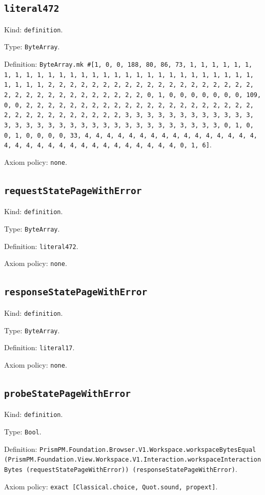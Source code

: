 \documentclass[11pt]{article}
\begin{document}
\subsection*{\texttt{literal472}}
\noindent Kind: \texttt{definition}.\par
\noindent Type: \texttt{ByteArray}.\par
\noindent Definition: \texttt{ByteArray.mk \#[1, 0, 0, 188, 80, 86, 73, 1, 1, 1, 1, 1, 1, 1, 1, 1, 1, 1, 1, 1, 1, 1, 1, 1, 1, 1, 1, 1, 1, 1, 1, 1, 1, 1, 1, 1, 1, 1, 1, 1, 2, 2, 2, 2, 2, 2, 2, 2, 2, 2, 2, 2, 2, 2, 2, 2, 2, 2, 2, 2, 2, 2, 2, 2, 2, 2, 2, 2, 2, 2, 2, 2, 0, 1, 0, 0, 0, 0, 0, 0, 0, 109, 0, 0, 2, 2, 2, 2, 2, 2, 2, 2, 2, 2, 2, 2, 2, 2, 2, 2, 2, 2, 2, 2, 2, 2, 2, 2, 2, 2, 2, 2, 2, 2, 2, 2, 3, 3, 3, 3, 3, 3, 3, 3, 3, 3, 3, 3, 3, 3, 3, 3, 3, 3, 3, 3, 3, 3, 3, 3, 3, 3, 3, 3, 3, 3, 3, 3, 0, 1, 0, 0, 1, 0, 0, 0, 0, 33, 4, 4, 4, 4, 4, 4, 4, 4, 4, 4, 4, 4, 4, 4, 4, 4, 4, 4, 4, 4, 4, 4, 4, 4, 4, 4, 4, 4, 4, 4, 4, 4, 0, 1, 6]}.\par
\noindent Axiom policy: \texttt{none}.\par
\subsection*{\texttt{requestStatePageWithError}}
\noindent Kind: \texttt{definition}.\par
\noindent Type: \texttt{ByteArray}.\par
\noindent Definition: \texttt{literal472}.\par
\noindent Axiom policy: \texttt{none}.\par
\subsection*{\texttt{responseStatePageWithError}}
\noindent Kind: \texttt{definition}.\par
\noindent Type: \texttt{ByteArray}.\par
\noindent Definition: \texttt{literal17}.\par
\noindent Axiom policy: \texttt{none}.\par
\subsection*{\texttt{probeStatePageWithError}}
\noindent Kind: \texttt{definition}.\par
\noindent Type: \texttt{Bool}.\par
\noindent Definition: \texttt{PrismPM.Foundation.Browser.V1.Workspace.workspaceBytesEqual (PrismPM.Foundation.View.Workspace.V1.Interaction.workspaceInteractionBytes (requestStatePageWithError)) (responseStatePageWithError)}.\par
\noindent Axiom policy: \texttt{exact [Classical.choice, Quot.sound, propext]}.\par
\end{document}
